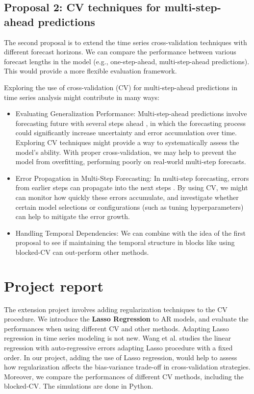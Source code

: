 \documentclass[12pt, oneside]{amsart}
\theoremstyle{definition}
\theoremstyle{remark}
\numberwithin{equation}{section}
\begin{document}
\subsection{Proposal 2: CV techniques for multi-step-ahead predictions} %
The second proposal is to extend the time series cross-validation techniques with different forecast horizons. We can compare the performance between various forecast lengths in the model (e.g., one-step-ahead, multi-step-ahead predictions). This would provide a more flexible evaluation framework.

Exploring the use of cross-validation (CV) for multi-step-ahead predictions in time series analysis might contribute in many ways:

\begin{itemize}
    \item Evaluating Generalization Performance: Multi-step-ahead predictions involve forecasting future with several steps ahead \citep{Cheng}, in which the forecasting process could significantly increase uncertainty and error accumulation over time. Exploring CV techniques might provide a way to systematically assess the model's ability. With proper cross-validation, we may help to prevent the model from overfitting, performing poorly on real-world multi-step forecasts. 
    \item Error Propagation in Multi-Step Forecasting: In multi-step forecasting, errors from earlier steps can propagate into the next steps \citep{Cheng}. By using CV, we might can monitor how quickly these errors accumulate, and investigate whether certain model selections or configurations (such as tuning hyperparameters) can help to mitigate the error growth.
    \item Handling Temporal Dependencies: We can combine with the idea of the first proposal to see if maintaining the temporal structure in blocks like using blocked-CV can out-perform other methods.
\end{itemize}

\section{Project report}
The extension project involves adding regularization techniques to the CV procedure. We introduce the \textbf{Lasso Regression} to AR models, and evaluate the performances when using different CV and other methods. Adapting Lasso regression in time series modeling is not new. Wang et al. \citep{Wang} studies the linear regression with auto-regressive errors adapting Lasso procedure with a fixed order. In our project, adding the use of Lasso regression, would help to assess how regularization affects the bias-variance trade-off in cross-validation strategies. Moreover, we compare the performances of different CV methods, including the blocked-CV. The simulations are done in Python. 
\end{document}
